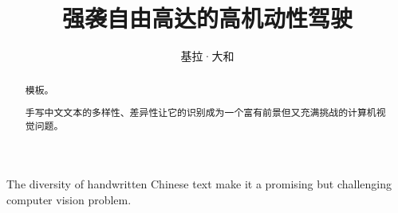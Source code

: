 \documentclass[winfonts, thesis]{njuthesis}
\title{强袭自由高达的高机动性驾驶}
\author{基拉·大和}
\begin{document}
\maketitle

\begin{abstract}
模板。

手写中文文本的多样性、差异性让它的识别成为一个富有前景但又充满挑战的计算机视觉问题。

\end{abstract}

\begin{englishabstract}
The diversity of handwritten Chinese text make it a promising but challenging computer vision problem. 
\end{englishabstract}

%
%
%
%

\tableofcontents


\end{document}
